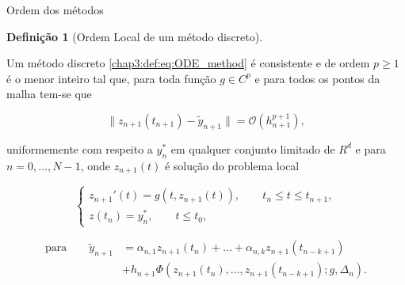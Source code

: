 \documentclass{beamer}
\theoremstyle{plain}
\theoremstyle{definition}
\newtheorem{defi}{Definição}
\begin{document}
    \begin{frame}{Ordem dos métodos}

        \footnotesize
        \begin{defi}[Ordem Local de um método discreto]
            \label{chap3:def:order_of_discrete_methods}

            Um método discreto \eqref{chap3:def:eq:ODE_method}  é consistente e de ordem $p \geq 1$ é o menor inteiro tal que, para toda função $g \in C^p$ e para todos os pontos da malha tem-se que 

            \begin{equation}
                \| z_{n+1}(t_{n+1}) - \tilde{y}_{n+1} \| = \mathcal{O} (h_{n+1}^{p+1}), 
                \label{chap3:eq:order_of_discrete_methods:1}
            \end{equation}

            \noindent
            uniformemente com respeito a $y_{n}^*$ em qualquer conjunto limitado de $R^d$ e para $n = 0, ..., N-1$, onde $z_{n+1}(t)$ é solução do problema local

            \begin{equation}
                \begin{cases}
                    z_{n+1}'(t) = g(t, z_{n+1}(t)), \qquad t_n \leq t \leq t_{n+1} , \\
                    z(t_n) = y_n ^*, \qquad t \leq t_0,
                \end{cases}
                \label{chap3:eq:order_of_discrete_methods:2}
            \end{equation}


            \begin{equation}
                \begin{split}
                    \text{para} \qquad 
                    \tilde{y}_{n+1} &= \alpha_{n, 1} z_{n+1}(t_n) + \dots + \alpha_{n, k} z_{n+1}(t_{n-k+1}) \\
                                   &+ h_{n+1} \Phi(z_{n+1}(t_n), \dots, z_{n+1}(t_{n-k+1}); g, \Delta_n).
                \end{split}
                \label{chap3:eq:order_of_discrete_methods:3}
            \end{equation}

        \end{defi}

\end{frame}



\end{document}
